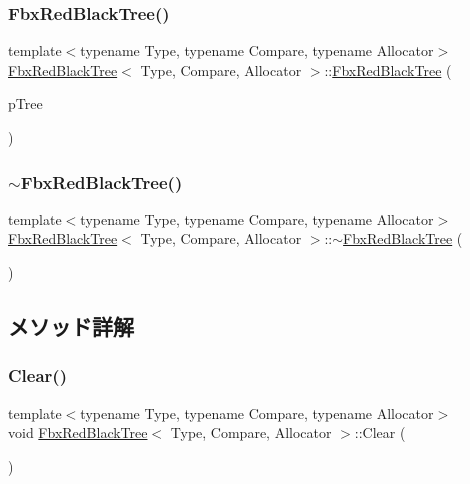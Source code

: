 \subsubsection{\texorpdfstring{Fbx\+Red\+Black\+Tree()}{FbxRedBlackTree()}\hspace{0.1cm}{\footnotesize\ttfamily [2/2]}}
{\footnotesize\ttfamily template$<$typename Type, typename Compare, typename Allocator$>$ \\
\hyperlink{class_fbx_red_black_tree}{Fbx\+Red\+Black\+Tree}$<$ Type, Compare, Allocator $>$\+::\hyperlink{class_fbx_red_black_tree}{Fbx\+Red\+Black\+Tree} (\begin{DoxyParamCaption}\item[{const \hyperlink{class_fbx_red_black_tree}{Fbx\+Red\+Black\+Tree}$<$ Type, Compare, Allocator $>$ \&}]{p\+Tree }\end{DoxyParamCaption})}

\mbox{\label{class_fbx_red_black_tree_ae12987fd6ad76bbb3b65bb3aeebb449c}} 
\subsubsection{\texorpdfstring{$\sim$\+Fbx\+Red\+Black\+Tree()}{~FbxRedBlackTree()}}
{\footnotesize\ttfamily template$<$typename Type, typename Compare, typename Allocator$>$ \\
\hyperlink{class_fbx_red_black_tree}{Fbx\+Red\+Black\+Tree}$<$ Type, Compare, Allocator $>$\+::$\sim$\hyperlink{class_fbx_red_black_tree}{Fbx\+Red\+Black\+Tree} (\begin{DoxyParamCaption}{ }\end{DoxyParamCaption})}



\subsection{メソッド詳解}
\mbox{\label{class_fbx_red_black_tree_aa762c1d9c1b533045066f713def691e2}} 
\subsubsection{\texorpdfstring{Clear()}{Clear()}}
{\footnotesize\ttfamily template$<$typename Type, typename Compare, typename Allocator$>$ \\
void \hyperlink{class_fbx_red_black_tree}{Fbx\+Red\+Black\+Tree}$<$ Type, Compare, Allocator $>$\+::Clear (\begin{DoxyParamCaption}{ }\end{DoxyParamCaption})}

